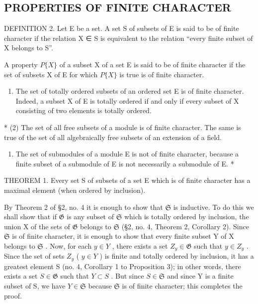 \subsection{PROPERTIES OF FINITE CHARACTER}

DEFINITION 2. Let E be a set. A set S of subsets of E is said to be of finite character if the relation X ∈ S is equivalent to the relation ``every finite subset of X belongs to S''.

A property \(P\{X\}\) of a subset X of a set E is said to be of finite character if the set of subsets X of E for which \(P\{X\}\) is true is of finite character.


\begin{enumerate}
\def\labelenumi{(\arabic{enumi})}
\tightlist
\item
  The set of totally ordered subsets of an ordered set E is of finite character. Indeed, a subset X of E is totally ordered if and only if every subset of X consisting of two elements is totally ordered.
\end{enumerate}

* (2) The set of all free subsets of a module is of finite character. The same is true of the set of all algebraically free subsets of an extension of a field.

\begin{enumerate}
\def\labelenumi{(\arabic{enumi})}
\setcounter{enumi}{2}
\tightlist
\item
  The set of submodules of a module E is not of finite character, because a finite subset of a submodule of E is not necessarily a submodule of E. *
\end{enumerate}

THEOREM 1. Every set S of subsets of a set E which is of finite character has a maximal element (when ordered by inclusion).

By Theorem 2 of §2, no. 4 it is enough to show that \(\mathfrak{S}\) is inductive. To do this we shall show that if \(\mathfrak{G}\) is any subset of \(\mathfrak{S}\) which is totally ordered by inclusion, the union X of the sets of \(\mathfrak{G}\) belongs to \(\mathfrak{S}\) (§2, no. 4, Theorem 2, Corollary 2). Since \(\mathfrak{S}\) is of finite character, it is enough to show that every finite subset Y of X belongs to \(\mathfrak{S}\) . Now, for each \(y \in Y\) , there exists a set \(Z_y \in \mathfrak{G}\) such that \(y \in Z_y\) . Since the set of sets \(Z_y\) ( \(y \in Y\) ) is finite and totally ordered by inclusion, it has a greatest element S (no. 4, Corollary 1 to Proposition 3); in other words, there exists a set \(S \in \mathfrak{G}\) such that \(Y \subset S\) . But since \(S \in \mathfrak{S}\) and since Y is a finite subset of S, we have \(Y \in \mathfrak{S}\) because \(\mathfrak{S}\) is of finite character; this completes the proof.

